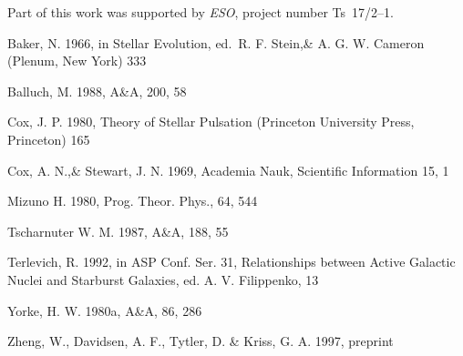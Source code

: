 \documentclass{aa}
\begin{document}
\begin{acknowledgements}
      Part of this work was supported by \emph{ESO}, project
      number Ts~17/2--1.
\end{acknowledgements}




%

\begin{thebibliography}{}

   Baker, N. 1966,
      in Stellar Evolution,
      ed.\ R. F. Stein,\& A. G. W. Cameron
      (Plenum, New York) 333

    Balluch, M. 1988,
      A\&A, 200, 58

    Cox, J. P. 1980,
      Theory of Stellar Pulsation
      (Princeton University Press, Princeton) 165

    Cox, A. N.,\& Stewart, J. N. 1969,
      Academia Nauk, Scientific Information 15, 1

    Mizuno H. 1980,
      Prog. Theor. Phys., 64, 544
   
    Tscharnuter W. M. 1987,
      A\&A, 188, 55
  
    Terlevich, R. 1992, in ASP Conf. Ser. 31,
      Relationships between Active Galactic Nuclei and Starburst Galaxies,
      ed. A. V. Filippenko, 13

    Yorke, H. W. 1980a,
      A\&A, 86, 286

    Zheng, W., Davidsen, A. F., Tytler, D. \& Kriss, G. A.
      1997, preprint
\end{thebibliography}


\end{document}
